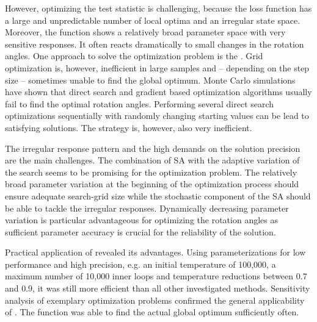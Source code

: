 However, optimizing the test statistic is challenging, because the loss function has a large and unpredictable number of local optima and an irregular state space. Moreover, the function shows a relatively broad parameter space with very sensitive responses. It often reacts dramatically to small changes in the rotation angles. One approach to solve the optimization problem is the  \citep{herwartz_2015}. Grid optimization is, however, inefficient in large samples and -- depending on the step size -- sometimes unable to find the global optimum. Monte Carlo simulations have shown that direct search and gradient based optimization algorithms usually fail to find the optimal rotation angles. Performing several direct search optimizations sequentially with randomly changing starting values can be lead to satisfying solutions. The strategy is, however, also very inefficient.

The irregular response pattern and the high demands on the solution precision are the main challenges. The combination of SA with the adaptive variation of the search seems to be promising for the optimization problem. The relatively broad parameter variation at the beginning of the optimization process should ensure adequate search-grid size while the stochastic component of the SA should be able to tackle the irregular responses. Dynamically decreasing parameter variation is particular advantageous for optimizing the rotation angles as sufficient parameter accuracy is crucial for the reliability of the solution.

Practical application of  revealed its advantages. Using parameterizations for low performance and high precision, e.g. an initial temperature of 100,000, a maximum number of 10,000 inner loops and temperature reductions between 0.7 and 0.9, it was still more efficient than all other investigated methods. Sensitivity analysis of exemplary optimization problems confirmed the general applicability of . The function was able to find the actual global optimum sufficiently often.

